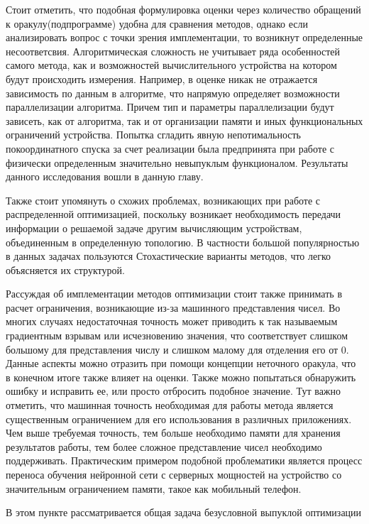   Стоит отметить, что подобная формулировка оценки через количество обращений к оракулу(подпрограмме) удобна для сравнения методов, однако если анализировать вопрос с точки зрения имплементации, то возникнут определенные несоответсвия. Алгоритмическая сложность не учитывает ряда особенностей самого метода, как и возможностей вычислительного устройства на котором будут происходить измерения. Например, в оценке никак не отражается зависимость по данным в алгоритме, что напрямую определяет возможности параллелизации алгоритма. Причем тип и параметры параллелизации будут зависеть, как от алгоритма, так и от организации памяти и иных функциональных ограничений устройства. Попытка сгладить явную непотимальность покоординатного спуска за счет реализации была предпринята при работе с физически определенным значительно невыпуклым функционалом. Результаты данного исследования вошли в данную главу. 

  Также стоит упомянуть о схожих проблемах, возникающих при работе с распределенной оптимизацией, поскольку возникает необходимость передачи информации о решаемой задаче другим вычисляющим устройствам, объединенным в определенную топологию. В частности большой популярностью в данных задачах пользуются Стохастические варианты методов, что легко объясняется их структурой. 

  Рассуждая об имплементации методов оптимизации стоит также принимать в расчет ограничения, возникающие из-за машинного представления чисел. Во многих случаях недостаточная точность может приводить к так называемым градиентным взрывам или исчезновению значения, что соответствует слишком большому для представления числу и слишком малому для отделения его от 0. Данные аспекты можно отразить при помощи концепции неточного оракула, что в конечном итоге также влияет на оценки. Также можно попытаться обнаружить ошибку и исправить ее, или просто отбросить подобное значение. Тут важно отметить, что машинная точность необходимая для работы метода является существенным ограничением для его использования в различных приложениях. Чем выше требуемая точность, тем больше необходимо памяти для хранения результатов работы, тем более сложное представление чисел необходимо поддерживать. Практическим примером подобной проблематики является процесс переноса обучения нейронной сети с серверных мощностей на устройство со значительным ограничением памяти, такое как мобильный телефон. 


  В этом пункте рассматривается общая задача безусловной выпуклой оптимизации \cite{gasnikov2017universal}

